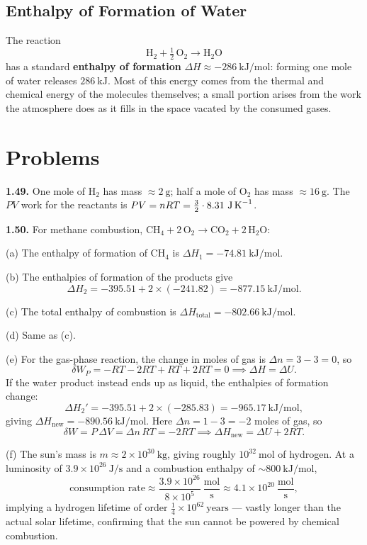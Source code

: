 \subsection*{Enthalpy of Formation of Water}

The reaction
\[
    \text{H}_2 + \tfrac{1}{2}\,\text{O}_2 \longrightarrow \text{H}_2\text{O}
\]
has a standard \textbf{enthalpy of formation} $\Delta H \approx -286\ \text{kJ/mol}$: forming one mole of water releases $286\ \text{kJ}$. Most of this energy comes from the thermal and chemical energy of the molecules themselves; a small portion arises from the work the atmosphere does as it fills in the space vacated by the consumed gases.

\section{Problems}

\textbf{1.49.} One mole of H$_2$ has mass $\approx 2\ \text{g}$; half a mole of O$_2$ has mass $\approx 16\ \text{g}$. The $PV$ work for the reactants is $PV = nRT = \tfrac{3}{2} \cdot 8.31\ \text{J\,K}^{-1}$.

\textbf{1.50.} For methane combustion, $\text{CH}_4 + 2\,\text{O}_2 \to \text{CO}_2 + 2\,\text{H}_2\text{O}$:

(a) The enthalpy of formation of CH$_4$ is $\Delta H_1 = -74.81\ \text{kJ/mol}$.

(b) The enthalpies of formation of the products give
\[
    \Delta H_2 = -395.51 + 2\times(-241.82) = -877.15\ \text{kJ/mol}.
\]

(c) The total enthalpy of combustion is $\Delta H_\text{total} = -802.66\ \text{kJ/mol}$.

(d) Same as (c).

(e) For the gas-phase reaction, the change in moles of gas is $\Delta n = 3 - 3 = 0$, so
\[
    \delta W_P = -RT - 2RT + RT + 2RT = 0 \implies \Delta H = \Delta U.
\]
If the water product instead ends up as liquid, the enthalpies of formation change:
\[
    \Delta H_2' = -395.51 + 2\times(-285.83) = -965.17\ \text{kJ/mol},
\]
giving $\Delta H_\text{new} = -890.56\ \text{kJ/mol}$. Here $\Delta n = 1 - 3 = -2$ moles of gas, so
\[
    \delta W = P\,\Delta V = \Delta n\, RT = -2RT \implies \Delta H_\text{new} = \Delta U + 2RT.
\]

(f) The sun's mass is $m \approx 2\times10^{30}\ \text{kg}$, giving roughly $10^{32}\ \text{mol}$ of hydrogen. At a luminosity of $3.9\times10^{26}\ \text{J/s}$ and a combustion enthalpy of $\sim 800\ \text{kJ/mol}$,
\[
    \text{consumption rate} \approx \frac{3.9\times10^{26}}{8\times10^5}\ \frac{\text{mol}}{\text{s}} \approx 4.1\times10^{20}\ \frac{\text{mol}}{\text{s}},
\]
implying a hydrogen lifetime of order $\tfrac{1}{4}\times10^{62}\ \text{years}$ --- vastly longer than the actual solar lifetime, confirming that the sun cannot be powered by chemical combustion.

